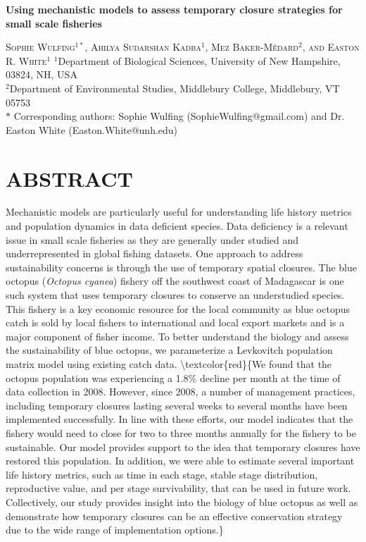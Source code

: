 \documentclass[
]{article}
\author{}
\date{\vspace{-2.5em}}
\begin{document}
\begin{center}
    
\textbf{\Large Using mechanistic models to assess temporary closure strategies for small scale fisheries}
    
\textsc{Sophie Wulfing$^{1*}$, Ahilya Sudarshan Kadba$^{1}$, Mez Baker-Médard$^{2}$, and Easton R. White$^{1}$}
\vspace{3 mm}
\normalsize{\indent $^1$Department of Biological Sciences, University of New Hampshire, 03824, NH, USA \\ $^2$Department of Environmental Studies, Middlebury College, Middlebury, VT 05753\\}
$\text{*}$ Corresponding authors: Sophie Wulfing (SophieWulfing@gmail.com) and Dr. Easton White (Easton.White@unh.edu)
\end{center}

\newpage

\linenumbers

\hypertarget{abstract}{%
\section{ABSTRACT}\label{abstract}}

Mechanistic models are particularly useful for understanding life history metrics and population dynamics in data deficient species. Data deficiency is a relevant issue in small scale fisheries as they are generally under studied and underrepresented in global fishing datasets. One approach to address sustainability concerns is through the use of temporary spatial closures. The blue octopus (\emph{Octopus cyanea}) fishery off the southwest coast of Madagascar is one such system that uses temporary closures to conserve an understudied species. This fishery is a key economic resource for the local community as blue octopus catch is sold by local fishers to international and local export markets and is a major component of fisher income. To better understand the biology and assess the sustainability of blue octopus, we parameterize a Levkovitch population matrix model using existing catch data. \textbackslash textcolor\{red\}\{We found that the octopus population was experiencing a 1.8\% decline per month at the time of data collection in 2008. However, since 2008, a number of management practices, including temporary closures lasting several weeks to several months have been implemented successfully. In line with these efforts, our model indicates that the fishery would need to close for two to three months annually for the fishery to be sustainable. Our model provides support to the idea that temporary closures have restored this population. In addition, we were able to estimate several important life history metrics, such as time in each stage, stable stage distribution, reproductive value, and per stage survivability, that can be used in future work. Collectively, our study provides insight into the biology of blue octopus as well as demonstrate how temporary closures can be an effective conservation strategy due to the wide range of implementation options.\}
\end{document}
